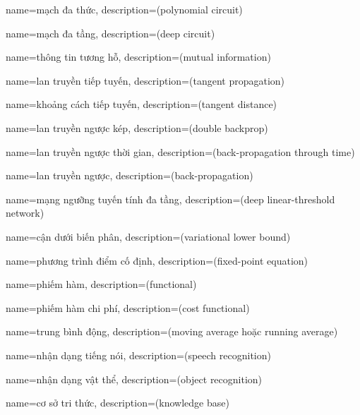 {
    name={mạch đa thức},
    description={(polynomial circuit)}
}

{
    name={mạch đa tầng},
    description={(deep circuit)}
}

{
    name={thông tin tương hỗ},
    description={(mutual information)}
}

{
    name={lan truyền tiếp tuyến},
    description={(tangent propagation)}
}

{
    name={khoảng cách tiếp tuyến},
    description={(tangent distance)}
}

{
    name={lan truyền ngược kép},
    description={(double backprop)}
}

{
    name={lan truyền ngược thời gian},
    description={(back-propagation through time)}
}


{
    name={lan truyền ngược},
    description={(back-propagation)}
}

{
    name={mạng ngưỡng tuyến tính đa tầng},
    description={(deep linear-threshold network)}
}

{
    name={cận dưới biến phân},
    description={(variational lower bound)}
}

{
    name={phương trình điểm cố định},
    description={(fixed-point equation)}
}

{
    name={phiếm hàm},
    description={(functional)}
}

{
    name={phiếm hàm chi phí},
    description={(cost functional)}
}

{
    name={trung bình động},
    description={(moving average hoặc running average)}
}

{
    name={nhận dạng tiếng nói},
    description={(speech recognition)}
}

{
    name={nhận dạng vật thể},
    description={(object recognition)}
}

{
    name={cơ sở tri thức},
    description={(knowledge base)}
}

